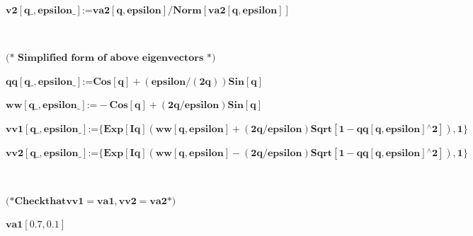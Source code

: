 {\begin{doublespace}
\noindent\(\pmb{\text{v2}[\text{q$\_$},\text{epsilon$\_$}]\text{:=}\text{va2}[q,\text{epsilon}]/\text{Norm}[\text{va2}[q,\text{epsilon}]]\text{ 
}}\)
\end{doublespace}

\begin{doublespace}
\noindent\(\pmb{\text{}}\)
\end{doublespace}

\begin{doublespace}
\noindent\(\pmb{\text{(* Simplified form of above eigenvectors *)}}\)
\end{doublespace}

\begin{doublespace}
\noindent\(\pmb{\text{qq}[\text{q$\_$},\text{epsilon$\_$}]\text{:=}\text{Cos}[q]+(\text{epsilon}/(2q))\text{Sin}[q] }\)
\end{doublespace}

\begin{doublespace}
\noindent\(\pmb{\text{ww}[\text{q$\_$},\text{epsilon$\_$}]\text{:=}-\text{Cos}[q]+(2q/\text{epsilon}) \text{Sin}[q]}\)
\end{doublespace}

\begin{doublespace}
\noindent\(\pmb{\text{vv1}[\text{q$\_$},\text{epsilon$\_$}]\text{:=} \{\text{Exp}[I q](\text{ww}[q,\text{epsilon}]+(2q/\text{epsilon})\text{Sqrt}[1-\text{qq}[q,\text{epsilon}]{}^{\wedge}2]),1\}}\)
\end{doublespace}

\begin{doublespace}
\noindent\(\pmb{\text{vv2}[\text{q$\_$},\text{epsilon$\_$}]\text{:=} \{\text{Exp}[I q](\text{ww}[q,\text{epsilon}]-(2q/\text{epsilon})\text{Sqrt}[1-\text{qq}[q,\text{epsilon}]{}^{\wedge}2]),1\}}\)
\end{doublespace}

\begin{doublespace}
\noindent\(\pmb{\text{}}\)
\end{doublespace}

\begin{doublespace}
\noindent\(\pmb{\text{(*} \text{Check} \text{that} \text{vv1} = \text{va1}, \text{vv2} = \text{va2} \text{*)}}\)
\end{doublespace}

\begin{doublespace}
\noindent\(\pmb{\text{va1}[0.7,0.1]}\)
\end{doublespace}

}
